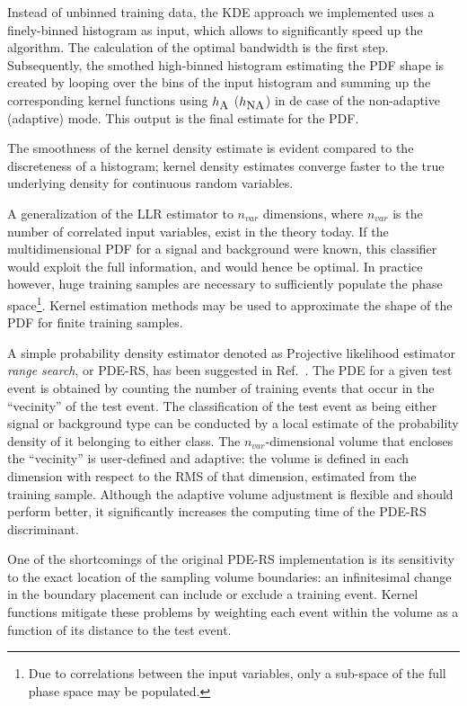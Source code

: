 Instead of unbinned training data, the KDE approach we implemented uses a finely-binned histogram as input, which allows to significantly speed up the algorithm. The calculation of the optimal bandwidth is the first step. Subsequently, the smothed high-binned histogram estimating the PDF shape is created by looping over the bins of the input histogram and summing up the corresponding kernel functions using $h_{\mbox{\small{A}}}$ ($h_{\mbox{\small{NA}}}$) in de case of the non-adaptive (adaptive) mode. This output is the final estimate for the PDF. 

The smoothness of the kernel density estimate is evident compared to the discreteness of a histogram; kernel density estimates converge faster to the true underlying density for continuous random variables.


A generalization of the LLR estimator to $n_{var}$ dimensions, where $n_{var}$ is the number of correlated input variables, exist in the theory today.  If the multidimensional PDF for a signal and background were known, this classifier would exploit the full information, and would hence be optimal. In practice however, huge training samples are necessary to sufficiently populate the phase space\footnote{Due to correlations between the input variables, only a sub-space of the full phase space may be populated.}. Kernel estimation methods may be used to approximate the shape of the PDF for finite training samples. 

A simple probability density estimator denoted as Projective likelihood estimator \emph{range search}, or PDE-RS, has been suggested in Ref.~\cite{Carli:2002jp}. The PDE for a given test event is obtained by counting the number of training events that occur in the ``vecinity'' of the test event. The classification of the test event as being either signal or background type can be conducted %
by a local estimate of the probability density of it belonging to either class.
The $n_{var}$-dimensional volume that encloses the ``vecinity'' is user-defined and  %
adaptive: the volume is defined in each dimension with respect to the RMS of that dimension, estimated from the training sample. Although the adaptive volume adjustment is flexible and should perform better, it significantly increases the computing time of the PDE-RS discriminant.

One of the shortcomings of the original PDE-RS implementation is its sensitivity to the exact
location of the sampling volume boundaries: an infinitesimal change in the boundary placement
can include or exclude a training event. Kernel functions mitigate these problems by weighting each event within the volume as a function of its distance to the test event. 

